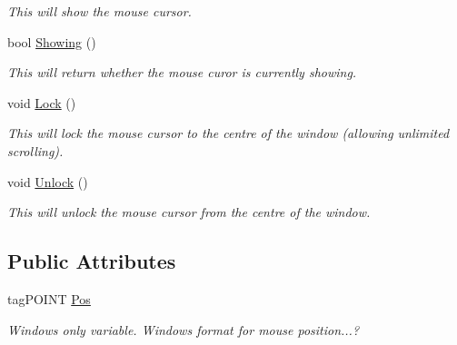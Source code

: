 \begin{DoxyCompactItemize}
\begin{DoxyCompactList}\small\item\em This will show the mouse cursor. \end{DoxyCompactList}\item 
\hypertarget{classc_mouse_a2653fbbb900967fda6eccf933019ab8d}{
bool \hyperlink{classc_mouse_a2653fbbb900967fda6eccf933019ab8d}{Showing} ()}
\label{classc_mouse_a2653fbbb900967fda6eccf933019ab8d}

\begin{DoxyCompactList}\small\item\em This will return whether the mouse curor is currently showing. \end{DoxyCompactList}\item 
\hypertarget{classc_mouse_abef74e9066d916ec62daf4a440dbbe58}{
void \hyperlink{classc_mouse_abef74e9066d916ec62daf4a440dbbe58}{Lock} ()}
\label{classc_mouse_abef74e9066d916ec62daf4a440dbbe58}

\begin{DoxyCompactList}\small\item\em This will lock the mouse cursor to the centre of the window (allowing unlimited scrolling). \end{DoxyCompactList}\item 
\hypertarget{classc_mouse_a869bb420067947a30b57ad649e3f1f14}{
void \hyperlink{classc_mouse_a869bb420067947a30b57ad649e3f1f14}{Unlock} ()}
\label{classc_mouse_a869bb420067947a30b57ad649e3f1f14}

\begin{DoxyCompactList}\small\item\em This will unlock the mouse cursor from the centre of the window. \end{DoxyCompactList}\end{DoxyCompactItemize}
\subsection*{Public Attributes}
\begin{DoxyCompactItemize}
\item 
\hypertarget{classc_mouse_ad6306d52aba6df1e6496c038db013442}{
tagPOINT \hyperlink{classc_mouse_ad6306d52aba6df1e6496c038db013442}{Pos}}
\label{classc_mouse_ad6306d52aba6df1e6496c038db013442}

\begin{DoxyCompactList}\small\item\em Windows only variable. Windows format for mouse position...? \end{DoxyCompactList}\end{DoxyCompactItemize}


